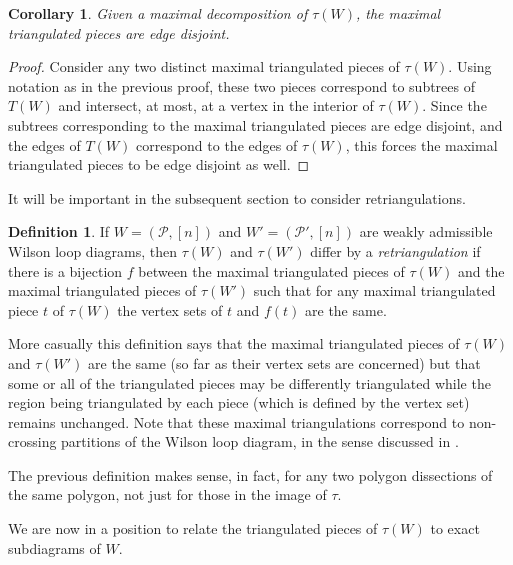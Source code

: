 \documentclass[11pt]{article}
\newcommand{\cP}{\mathcal{P}}
\newtheorem{cor}[thm]{Corollary}
\theoremstyle{remark}
\theoremstyle{definition}
\newtheorem{dfn}[thm]{Definition}
\begin{document}
\begin{cor} \label{maxtriangdisjointcor}
Given a maximal decomposition of $\tau(W)$, the maximal triangulated pieces are edge disjoint.
\end{cor}

\begin{proof}
Consider any two distinct maximal triangulated pieces of $\tau(W)$. Using notation as in the previous proof, these two pieces correspond to subtrees of $T(W)$ and intersect, at most, at a vertex in the interior of $\tau(W)$. Since the subtrees corresponding to the maximal triangulated pieces are edge disjoint, and the edges of $T(W)$ correspond to the edges of $\tau(W)$, this forces the maximal triangulated pieces to be edge disjoint as well.
\end{proof}

It will be important in the subsequent section to consider retriangulations.
\begin{dfn} \label{retriangulation}
  If $W = (\cP, [n])$ and $W' = (\cP', [n])$ are weakly admissible Wilson loop diagrams, then $\tau(W)$ and $\tau(W')$  differ by a \emph{retriangulation} if there is a bijection $f$ between the maximal triangulated pieces of $\tau(W)$ and the maximal triangulated pieces of $\tau(W')$ such that for any maximal triangulated piece $t$ of $\tau(W)$ the vertex sets of $t$ and $f(t)$ are the same.
\end{dfn}
More casually this definition says that the maximal triangulated pieces of $\tau(W)$ and $\tau(W')$ are the same (so far as their vertex sets are concerned) but that some or all of the triangulated pieces may be differently triangulated while the region being triangulated by each piece (which is defined by the vertex set) remains unchanged. Note that these maximal triangulations correspond to non-crossing partitions of the Wilson loop diagram, in the sense discussed in \cite{positroids13}. 

The previous definition makes sense, in fact, for any two polygon dissections of the same polygon, not just for those in the image of $\tau$.

\medskip
  
We are now in a position to relate the triangulated pieces of $\tau(W)$ to exact subdiagrams of $W$.
\end{document}
